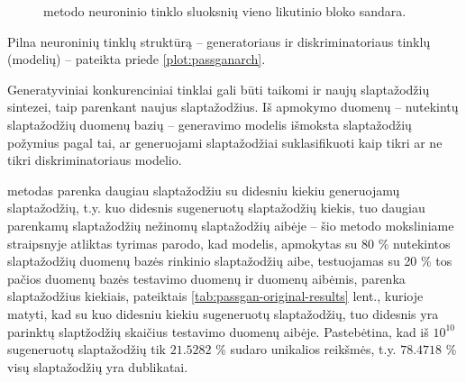 \documentclass{VUMIFInfBakalaurinis}
\begin{document}
\begin{figure}[!ht]
  \begin{center}
  \end{center}
  \caption{
     metodo neuroninio tinklo sluoksnių vieno likutinio bloko 
    sandara.
  }
  \label{plot:passganblock}
\end{figure}

Pilna neuroninių tinklų struktūrą -- generatoriaus ir diskriminatoriaus tinklų 
(modelių) -- pateikta priede \ref{plot:passganarch}.

Generatyviniai konkurenciniai tinklai gali būti taikomi ir naujų slaptažodžių 
sintezei, taip parenkant naujus slaptažodžius. Iš apmokymo duomenų -- nutekintų 
slaptažodžių duomenų bazių -- generavimo modelis išmoksta slaptažodžių požymius 
pagal tai, ar generuojami slaptažodžiai suklasifikuoti kaip tikri ar ne tikri 
diskriminatoriaus modelio.

 metodas parenka daugiau slaptažodžiu su didesniu kiekiu 
generuojamų slaptažodžių, t.y. kuo didesnis sugeneruotų slaptažodžių kiekis, tuo 
daugiau parenkamų slaptažodžių nežinomų slaptažodžių aibėje -- šio metodo 
moksliniame straipsnyje atliktas tyrimas parodo, kad modelis, apmokytas su 80 \% 
 nutekintos slaptažodžių duomenų bazės rinkinio slaptažodžių 
aibe, testuojamas su 20 \% tos pačios duomenų bazės testavimo duomenų ir 
 duomenų aibėmis, parenka slaptažodžius kiekiais, pateiktais 
\ref{tab:passgan-original-results} lent., kurioje matyti, kad su kuo didesniu 
kiekiu sugeneruotų slaptažodžių, tuo didesnis yra parinktų slaptžodžių skaičius 
testavimo duomenų aibėje. Pastebėtina, kad iš $10^10$ sugeneruotų slaptažodžių 
tik $21.5282$ \% sudaro unikalios reikšmės, t.y. $78.4718$ \% visų slaptažodžių 
yra dublikatai.
\end{document}
